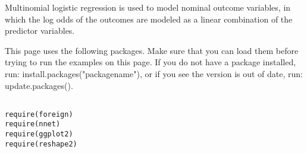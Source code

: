 \documentclass[00-GLMregslides.tex]{subfiles}
\begin{document}
	
\newpage
	
\begin{frame}
\Large
	


Multinomial logistic regression is used to model nominal outcome variables, in which the log odds of the outcomes are modeled as a linear combination of the predictor variables.

 
\end{frame}

\begin{frame}[fragile]

This page uses the following packages. Make sure that you can load them before trying to run the examples on this page. If you do not have a package installed, run: install.packages("packagename"), or if you see the version is out of date, run: update.packages().

\begin{framed}
\begin{verbatim}

require(foreign)
require(nnet)
require(ggplot2)
require(reshape2)
\end{verbatim}
\end{framed}



\end{frame}
\end{document}
